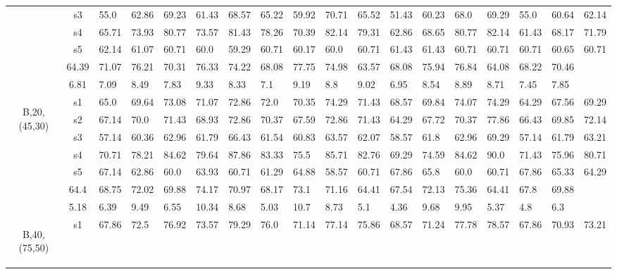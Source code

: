 \begin{table}[h]
{\begin{tabular}{cc|llll|llll|llll|llll}
 & s3 & 55.0 & 62.86 & 69.23 & 61.43 & 68.57 & 65.22 & 59.92 & 70.71 & 65.52 & 51.43 & 60.23 & 68.0 & 69.29 & 55.0 & 60.64 & 62.14 \\
 & s4 & 65.71 & 73.93 & 80.77 & 73.57 & 81.43 & 78.26 & 70.39 & 82.14 & 79.31 & 62.86 & 68.65 & 80.77 & 82.14 & 61.43 & 68.17 & 71.79 \\
 & s5 & 62.14 & 61.07 & 60.71 & 60.0 & 59.29 & 60.71 & 60.17 & 60.0 & 60.71 & 61.43 & 61.43 & 60.71 & 60.71 & 60.71 & 60.65 & 60.71 \\
\rowcolor{lightgray!50}\multicolumn{2}{r|}{avg} & 64.39 & 71.07 & 76.21 & 70.31 & 76.33 & 74.22 & 68.08 & 77.75 & 74.98 & 63.57 & 68.08 & 75.94 & 76.84 & 64.08 & 68.22 & 70.46 \\
\rowcolor{lightgray!50}\multicolumn{2}{r|}{std} & 6.81 & 7.09 & 8.49 & 7.83 & 9.33 & 8.33 & 7.1 & 9.19 & 8.8 & 9.02 & 6.95 & 8.54 & 8.89 & 8.71 & 7.45 & 7.85 \\
\multirow{6}{*}{\begin{sideways}B,20,(45,30)\end{sideways}} & s1 & 65.0 & 69.64 & 73.08 & 71.07 & 72.86 & 72.0 & 70.35 & 74.29 & 71.43 & 68.57 & 69.84 & 74.07 & 74.29 & 64.29 & 67.56 & 69.29 \\
 & s2 & 67.14 & 70.0 & 71.43 & 68.93 & 72.86 & 70.37 & 67.59 & 72.86 & 71.43 & 64.29 & 67.72 & 70.37 & 77.86 & 66.43 & 69.85 & 72.14 \\
 & s3 & 57.14 & 60.36 & 62.96 & 61.79 & 66.43 & 61.54 & 60.83 & 63.57 & 62.07 & 58.57 & 61.8 & 62.96 & 69.29 & 57.14 & 61.79 & 63.21 \\
 & s4 & 70.71 & 78.21 & 84.62 & 79.64 & 87.86 & 83.33 & 75.5 & 85.71 & 82.76 & 69.29 & 74.59 & 84.62 & 90.0 & 71.43 & 75.96 & 80.71 \\
 & s5 & 67.14 & 62.86 & 60.0 & 63.93 & 60.71 & 61.29 & 64.88 & 58.57 & 60.71 & 67.86 & 65.8 & 60.0 & 60.71 & 67.86 & 65.33 & 64.29 \\
\rowcolor{lightgray!50}\multicolumn{2}{r|}{avg} & 64.4 & 68.75 & 72.02 & 69.88 & 74.17 & 70.97 & 68.17 & 73.1 & 71.16 & 64.41 & 67.54 & 72.13 & 75.36 & 64.41 & 67.8 & 69.88 \\
\rowcolor{lightgray!50}\multicolumn{2}{r|}{std} & 5.18 & 6.39 & 9.49 & 6.55 & 10.34 & 8.68 & 5.03 & 10.7 & 8.73 & 5.1 & 4.36 & 9.68 & 9.95 & 5.37 & 4.8 & 6.3 \\
\multirow{6}{*}{\begin{sideways}B,40,(75,50)\end{sideways}} & s1 & 67.86 & 72.5 & 76.92 & 73.57 & 79.29 & 76.0 & 71.14 & 77.14 & 75.86 & 68.57 & 71.24 & 77.78 & 78.57 & 67.86 & 70.93 & 73.21 \\

\end{tabular}}
\end{table}
